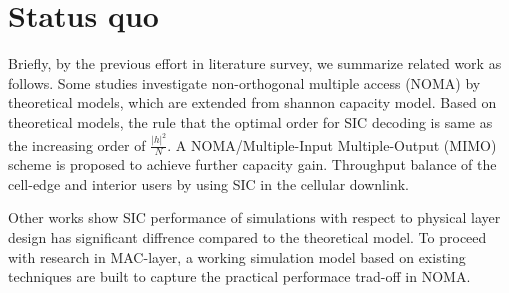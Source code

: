 \section{Status quo}
\label{sec_status_quo}

Briefly, by the previous effort in literature survey, we summarize related 
work as follows.
Some studies investigate non-orthogonal multiple access (NOMA) by theoretical 
models, which are extended from shannon capacity model.
Based on theoretical models, the rule that the optimal order for SIC decoding 
is same as the increasing order of $\frac{|h|^2}{N}$. 
A NOMA/Multiple-Input Multiple-Output (MIMO) scheme is proposed to achieve 
further capacity gain.
Throughput balance of the cell-edge and interior users by using SIC in the 
cellular downlink.
%
%

Other works show SIC performance of simulations with respect to physical layer 
design has significant diffrence compared to the theoretical model.
To proceed with research in MAC-layer, a working simulation model based on
existing techniques are built to capture the practical performace trad-off
in NOMA.
